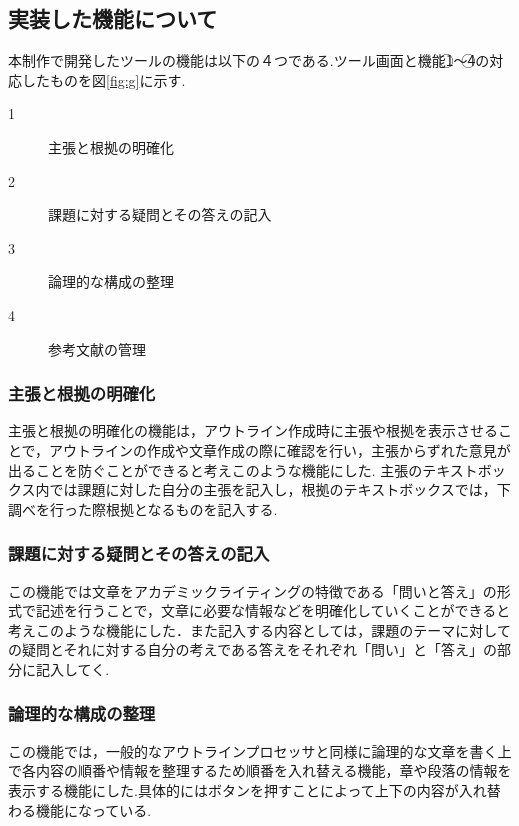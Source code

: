 \documentclass[a4j,12pt]{jarticle}
\begin{document}
\subsection{実装した機能について}
本制作で開発したツールの機能は以下の４つである.ツール画面と機能\textcircled{\scriptsize 1}〜\textcircled{\scriptsize 4}の対応したものを図\ref{fig:g}に示す.
\begin{description}
  \item[\textcircled{\scriptsize 1}]主張と根拠の明確化
  \item[\textcircled{\scriptsize 2}]課題に対する疑問とその答えの記入
  \item[\textcircled{\scriptsize 3}]論理的な構成の整理
  \item[\textcircled{\scriptsize 4}]参考文献の管理
 \end{description}

\subsubsection{主張と根拠の明確化}
主張と根拠の明確化の機能は，アウトライン作成時に主張や根拠を表示させることで，アウトラインの作成や文章作成の際に確認を行い，主張からずれた意見が出ることを防ぐことができると考えこのような機能にした.
主張のテキストボックス内では課題に対した自分の主張を記入し，根拠のテキストボックスでは，下調べを行った際根拠となるものを記入する.

\subsubsection{課題に対する疑問とその答えの記入}
この機能では文章をアカデミックライティングの特徴である「問いと答え」の形式で記述を行うことで，文章に必要な情報などを明確化していくことができると考えこのような機能にした．また記入する内容としては，課題のテーマに対しての疑問とそれに対する自分の考えである答えをそれぞれ「問い」と「答え」の部分に記入してく.

\subsubsection{論理的な構成の整理}
この機能では，一般的なアウトラインプロセッサと同様に論理的な文章を書く上で各内容の順番や情報を整理するため順番を入れ替える機能，章や段落の情報を表示する機能にした.具体的にはボタンを押すことによって上下の内容が入れ替わる機能になっている.
\end{document}
